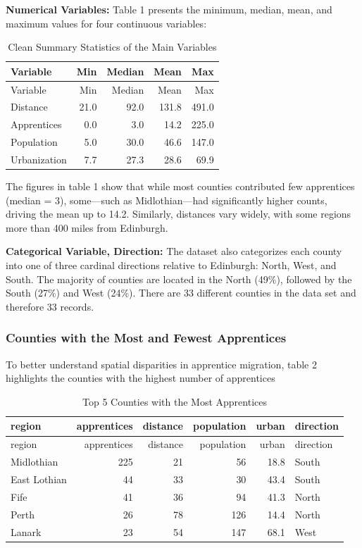 \documentclass[
  12pt,
]{article}
\begin{document}
\textbf{Numerical Variables:} Table 1 presents the minimum, median,
mean, and maximum values for four continuous variables:

\begin{longtable}[]{@{}lrrrr@{}}
\caption{Clean Summary Statistics of the Main Variables}\tabularnewline
\toprule\noalign{}
Variable & Min & Median & Mean & Max \\
\midrule\noalign{}
\endfirsthead
\toprule\noalign{}
Variable & Min & Median & Mean & Max \\
\midrule\noalign{}
\endhead
\bottomrule\noalign{}
\endlastfoot
Distance & 21.0 & 92.0 & 131.8 & 491.0 \\
Apprentices & 0.0 & 3.0 & 14.2 & 225.0 \\
Population & 5.0 & 30.0 & 46.6 & 147.0 \\
Urbanization & 7.7 & 27.3 & 28.6 & 69.9 \\
\end{longtable}

The figures in table 1 show that while most counties contributed few
apprentices (median = 3), some---such as Midlothian---had significantly
higher counts, driving the mean up to 14.2. Similarly, distances vary
widely, with some regions more than 400 miles from Edinburgh.

\textbf{Categorical Variable, Direction: } The dataset also categorizes
each county into one of three cardinal directions relative to Edinburgh:
North, West, and South. The majority of counties are located in the
North (49\%), followed by the South (27\%) and West (24\%). There are 33
different counties in the data set and therefore 33 records.

\subsubsection{Counties with the Most and Fewest
Apprentices}\label{counties-with-the-most-and-fewest-apprentices}

To better understand spatial disparities in apprentice migration, table
2 highlights the counties with the highest number of apprentices

\begin{longtable}[]{@{}lrrrrl@{}}
\caption{Top 5 Counties with the Most Apprentices}\tabularnewline
\toprule\noalign{}
region & apprentices & distance & population & urban & direction \\
\midrule\noalign{}
\endfirsthead
\toprule\noalign{}
region & apprentices & distance & population & urban & direction \\
\midrule\noalign{}
\endhead
\bottomrule\noalign{}
\endlastfoot
Midlothian & 225 & 21 & 56 & 18.8 & South \\
East Lothian & 44 & 33 & 30 & 43.4 & South \\
Fife & 41 & 36 & 94 & 41.3 & North \\
Perth & 26 & 78 & 126 & 14.4 & North \\
Lanark & 23 & 54 & 147 & 68.1 & West \\
\end{longtable}
\end{document}
